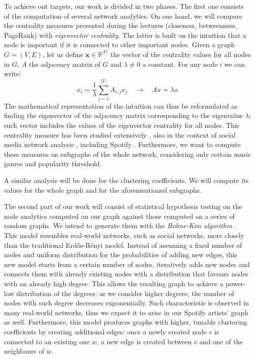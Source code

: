 \documentclass[a4paper, 12pt, conference]{ieeeconf}      %
\begin{document}
To achieve out targets, our work is divided in two phases. The first one consists of the computation of several network analytics. On one hand, we will compare the centrality measures presented during the lectures (closeness, betweenness, PageRank) with \emph{eigenvector centrality}. The latter is built on the intuition that a node is important if it is connected to other important nodes. Given a graph $G=(V,E)$, let us define $\textbf{x}\in\mathbb{R}^{|V|}$ the vector of the centrality values for all nodes in $G$, $A$ the adjacency matrix of $G$ and $\lambda\neq 0$ a constant. For any node $i$ we can write: $$x_i=\frac{1}{\lambda}\sum_{j=1}^{|V|}A_{i,j}x_j \quad \rightarrow \quad Ax=\lambda x$$
The mathematical representation of the intuition can thus be reformulated as finding the eigenvector of the adjacency matrix corresponding to the eigenvalue $\lambda$; such vector includes the values of the eigenvector centrality for all nodes. This centrality measure has been studied extensively \cite{Bonacich2007} \cite{Borgatti2006} \cite{Spizzirri2011}, also in the context of social media network analysis \cite{Maharani2014}, including Spotify \cite{South2021} \cite{South2018}. Furthermore, we want to compute these measures on subgraphs of the whole network, considering only certain music genres and popularity threshold.

A similar analysis will be done for the clustering coefficients. We will compute its values for the whole graph and for the aforementioned subgraphs.

The second part of our work will consist of statistical hypothesis testing on the node analytics computed on our graph against those computed on a series of random graphs. We intend to generate them with the \emph{Holme-Kim algorithm} \cite{Holme2002}. This model resembles real-world networks, such as social networks, more closely than the traditional Erd\H{o}s-R\'{e}nyi model. Instead of assuming a fixed number of nodes and uniform distribution for the probabilities of adding new edges, this new model starts from a certain number of nodes, iteratively adds new nodes and connects them with already existing nodes with a distribution that favours nodes with an already high degree. This allows the resulting graph to achieve a power-law distribution of the degrees: as we consider higher degrees, the number of nodes with such degree decreases exponentially. Such characteristic is observed in many real-world networks, thus we expect it to arise in our Spotify artists' graph as well. Furthermore, this model produces graphs with higher, tunable clustering coefficients by creating additional edges: once a newly created node $v$ is connected to an existing one $w$, a new edge is created between $v$ and one of the neighbours of $w$.
\end{document}
